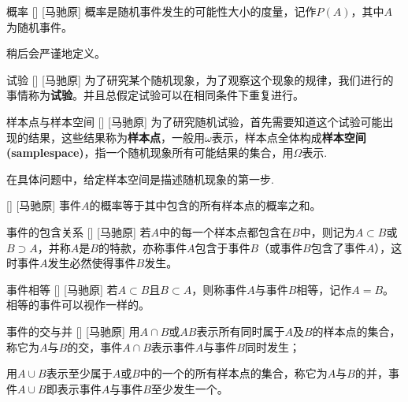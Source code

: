 \documentclass[UTF8]{ctexart}
\begin{document}
        \begin{dfn}
            []
            {概率}
            []
            [马驰原]
            概率是随机事件发生的可能性大小的度量，记作$P(A)$，其中$A$为随机事件。
        \end{dfn}

        稍后会严谨地定义。

        \begin{dfn}
            []
            {试验}
            []
            [马驰原]
            为了研究某个随机现象，为了观察这个现象的规律，我们进行的事情称为\textbf{试验}。并且总假定试验可以在相同条件下重复进行。
        \end{dfn}

        \begin{dfn}
            []
            {样本点与样本空间}
            []
            [马驰原]
            为了研究随机试验，首先需要知道这个试验可能出现的结果，这些结果称为\textbf{样本点}，一般用$\omega$表示，样本点全体构成\textbf{样本空间(samplespace)}，指一个随机现象所有可能结果的集合，用$\Omega$表示.
        \end{dfn}

        在具体问题中，给定样本空间是描述随机现象的第一步.

        \begin{ppt}
            []
            {}
            []
            [马驰原]
            事件$A$的概率等于其中包含的所有样本点的概率之和。
        \end{ppt}

        \begin{dfn}
            []
            {事件的包含关系}
            []
            [马驰原]
            若$A$中的每一个样本点都包含在$B$中，则记为$A\subset B$或$B\supset  A$，并称$A$是$B$的特款，亦称事件$A$包含于事件$B$（或事件$B$包含了事件$A$），这时事件$A$发生必然使得事件$B$发生。
        \end{dfn}

        \begin{dfn}
            []
            {事件相等}
            []
            [马驰原]
            若$A\subset B$且$B\subset A$，则称事件$A$与事件$B$相等，记作$A=B$。相等的事件可以视作一样的。
        \end{dfn}

        \begin{dfn}
            []
            {事件的交与并}
            []
            [马驰原]
            用$A\cap B$或$AB$表示所有同时属于$A$及$B$的样本点的集合，称它为$A$与$B$的交，事件$A\cap B$表示事件$A$与事件$B$同时发生；
    
            用$A\cup  B$表示至少属于$A$或$B$中的一个的所有样本点的集合，称它为$A$与$B$的并，事件$A\cup B$即表示事件$A$与事件$B$至少发生一个。
        \end{dfn}
\end{document}
